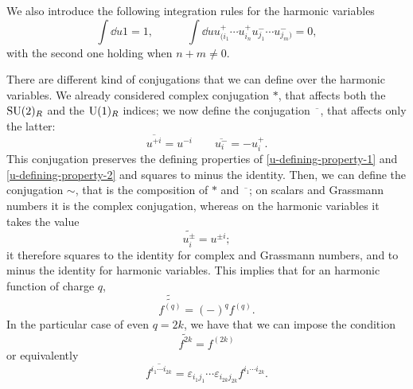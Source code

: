 We also introduce the following integration rules for the harmonic variables
\begin{equation}\label{integratioon-harmonics}
\int \dd{u} 1 = 1,
\hspace{3em}
\int \dd{u} u^+_{(i_1} \cdots u^+_{i_n} u^-_{j_1} \cdots u^-_{j_m)} = 0,
\end{equation}
with the second one holding when $n + m \neq 0 $.

There are different kind of conjugations that we can define over the harmonic variables. We already considered complex conjugation $*$, that affects both the ${ \text{SU} }(2)_R$ and the ${ \text{U} }(1)_R$ indices; we now define the conjugation $\overline{\phantom{x}}$, that affects only the latter:
\begin{equation}
\overline{u^{+i}} = u^{-i}
\qquad
\overline{u^{-}_{i}} = -u^+_{i}.
\end{equation}
This conjugation preserves the defining properties of \eqref{u-defining-property-1} and  \eqref{u-defining-property-2} and squares to minus the identity.
Then, we can define the conjugation $\sim$, that is the composition of $*$ and $\overline{\phantom{x}}$; on scalars and Grassmann numbers it is the complex conjugation, whereas on the harmonic variables it takes the value
\begin{equation}
\widetilde{u^{\pm}_{i}} = u^{\pm i}
;
\end{equation}
it therefore squares to the identity for complex and Grassmann numbers, and to minus the identity for harmonic variables.
This implies that for an harmonic function of charge $q$, 
\begin{equation}
\widetilde{\widetilde{ f^{(q)}}} = (-)^q f^{(q)}.
\end{equation}
In the particular case of even $q=2k$, we have that we can impose the condition
\begin{equation}
\widetilde{f^{2k}} = f^{(2k)}
\end{equation}
or equivalently
\begin{equation}
\overline{f^{i_1 \cdots i_{2k}}} = \varepsilon_{i_1 j_1} \cdots \varepsilon_{i_{2k} j_{2k}} f^{{i_1 \cdots i_{2k}}}.
\end{equation}


